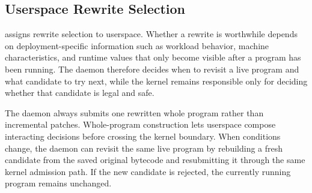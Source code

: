 \subsection{Userspace Rewrite Selection}
\label{sec:design-daemon}

\tool assigns rewrite selection to userspace. Whether a rewrite is worthwhile depends on deployment-specific information such as workload behavior, machine characteristics, and runtime values that only become visible after a program has been running. The daemon therefore decides when to revisit a live program and what candidate to try next, while the kernel remains responsible only for deciding whether that candidate is legal and safe.

The daemon always submits one rewritten whole program rather than incremental patches. Whole-program construction lets userspace compose interacting decisions before crossing the kernel boundary. When conditions change, the daemon can revisit the same live program by rebuilding a fresh candidate from the saved original bytecode and resubmitting it through the same kernel admission path. If the new candidate is rejected, the currently running program remains unchanged.
